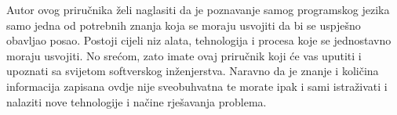 \begin{importantbox}
    Autor ovog priručnika želi naglasiti da je poznavanje samog programskog jezika samo jedna od potrebnih znanja koja se moraju usvojiti da bi se uspješno obavljao posao. Postoji cijeli niz alata, tehnologija i procesa koje se jednostavno moraju usvojiti. No srećom, zato imate ovaj priručnik koji će vas uputiti i upoznati sa svijetom softverskog inženjerstva. Naravno da je znanje i količina informacija zapisana ovdje nije sveobuhvatna te morate ipak i sami istraživati i nalaziti nove tehnologije i načine rješavanja problema.
\end{importantbox}